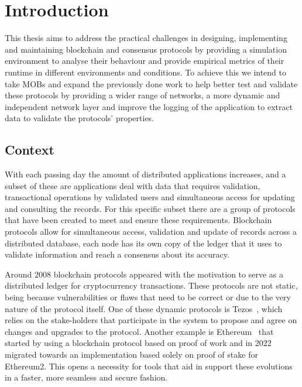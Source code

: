 
%

\chapter{Introduction}\label{cha:introduction}

This thesis aims to address the practical challenges in designing, implementing and maintaining blockchain and consensus
protocols by providing a simulation environment to analyse their behaviour and provide empirical metrics of their runtime in
different environments and conditions. To achieve this we intend to take MOBs and expand
the previously done work to help better test and validate these protocols by providing a wider range of networks,
a more dynamic and independent network layer and improve the logging of the application to extract data to validate the
protocols' properties.


\section{Context}\label{sub:context}
With each passing day the amount of distributed applications increases, and a subset of these are applications
deal with data that requires validation, transactional operations by validated users and simultaneous access for updating and
consulting the records. For this specific subset there are a group of protocols that have been created to meet and ensure
these requirements. Blockchain protocols allow for simultaneous access, validation and update of records across
a distributed database, each node has its own copy of the ledger that it uses to validate information and reach a consensus
about its accuracy.

Around 2008 blockchain protocols appeared with the motivation
to serve as a distributed ledger for cryptocurrency transactions. These protocols are not static, being because vulnerabilities 
or flaws that need to be correct or due to the very nature of the protocol itself.
One of these dynamic protocols is Tezos~\cite{tezos}, which relies on the stake-holders that participate in the system to propose and
agree on changes and upgrades to the protocol. Another example is Ethereum~\cite{ethereum} that started by using a blockchain protocol based on proof
of work and in 2022 migrated towards an implementation based solely on proof of stake for Ethereum2.
This opens a necessity for tools that aid in support these evolutions in a faster, more seamless and secure fashion.

